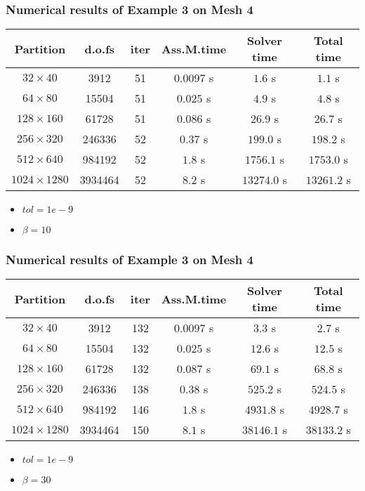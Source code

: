 \documentclass[notheorems,serif]{beamer}
\begin{document}
\begin{frame}
\frametitle{Numerical results of Example 3 on Mesh 4}
\begin{tabular}{ |c|c|c|c|c|c| }   
\hline   
Partition & d.o.fs & iter & Ass.M.time & Solver time & Total time \\
\hline
$32\times 40$ & 3912 & 51 & $0.0097$ s & $1.6$ s & $1.1$ s \\
$64\times 80$ & 15504 & 51 & $0.025$ s & $4.9$ s & $4.8$ s \\
$128\times 160$ & 61728 & 51 & $0.086$ s & $26.9$ s & $26.7$ s \\
$256\times 320$ & 246336 & 52 & $0.37$ s & $199.0$ s & $198.2$ s \\
$512\times 640$ & 984192 & 52 & $1.8$ s & $1756.1$ s & $1753.0$ s \\
$1024\times 1280$ & 3934464 & 52 & $8.2$ s & $13274.0$ s & $13261.2$ s \\
\hline 
\end{tabular}
\smallskip
\begin{itemize}
\item $tol = 1e-9$
\item $\beta = 10$
\end{itemize}
\end{frame}

\begin{frame}
\frametitle{Numerical results of Example 3 on Mesh 4}
\begin{tabular}{ |c|c|c|c|c|c| }   
\hline   
Partition & d.o.fs & iter & Ass.M.time & Solver time & Total time \\
\hline
$32\times 40$ & 3912 & 132 & $0.0097$ s & $3.3$ s & $2.7$ s \\
$64\times 80$ & 15504 & 132 & $0.025$ s & $12.6$ s & $12.5$ s \\
$128\times 160$ & 61728 & 132 & $0.087$ s & $69.1$ s & $68.8$ s \\
$256\times 320$ & 246336 & 138 & $0.38$ s & $525.2$ s & $524.5$ s \\
$512\times 640$ & 984192 & 146 & $1.8$ s & $4931.8$ s & $4928.7$ s \\
$1024\times 1280$ & 3934464 & 150 & $8.1$ s & $38146.1$ s & $38133.2$ s \\
\hline 
\end{tabular}
\smallskip
\begin{itemize}
\item $tol = 1e-9$
\item $\beta = 30$
\end{itemize}
\end{frame}
\end{document}
